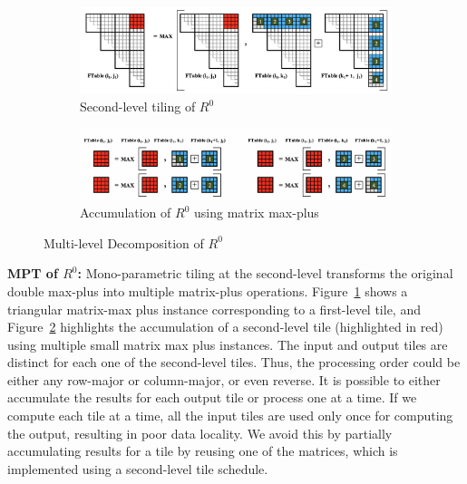 \begin{figure}
\centering
\begin{subfigure}[htbp]{0.48\textwidth}
\centering
\includegraphics[scale=0.36, trim=4 4 4 4,clip]{content/figures/r0_mono_paramteric.png}
\caption{Second-level tiling of $R^{0}$}
\label{fig:mono_parametric_tile_r0}
\end{subfigure}
\hfill
\centering
\vspace{1mm}
\begin{subfigure}[htbp]{0.48\textwidth}
\centering
\includegraphics[scale=0.37, trim=4 4 4 4,clip]{content/figures/r0_max_plus.png}
\caption{Accumulation of $R^{0}$ using matrix max-plus}
\label{fig:matrix_max_plus_accum}
\end{subfigure}
\caption{Multi-level Decomposition of $R^{0}$}
\label{fig:rectangular_matrix_max_plus}
\end{figure}

\textbf{\textbf{MPT} of $R^{0}$:}
Mono-parametric tiling at the second-level transforms the original double max-plus into multiple matrix-plus operations.
Figure~\ref{fig:mono_parametric_tile_r0} shows a triangular matrix-max plus instance corresponding to a first-level tile, and Figure~\ref{fig:matrix_max_plus_accum} highlights the accumulation of a second-level tile (highlighted in red) using multiple small matrix max plus instances. The input and output tiles are distinct for each one of the second-level tiles. Thus, the processing order could be either any row-major or column-major, or even reverse. It is possible to either accumulate the results for each output tile or process one at a time. If we compute each tile at a time, all the input tiles are used only once for computing the output, resulting in poor data locality. We avoid this by partially accumulating results for a tile by reusing one of the matrices, which is implemented using a second-level tile schedule.



